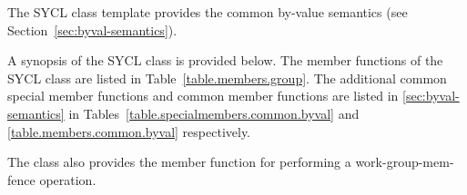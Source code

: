 The SYCL  class template provides the common by-value
semantics (see Section~\ref{sec:byval-semantics}).

A synopsis of the SYCL  class is provided below. The member functions of the SYCL  class are listed in Table~\ref{table.members.group}. The additional common special member functions and common member functions are listed in \ref{sec:byval-semantics} in Tables~\ref{table.specialmembers.common.byval} and \ref{table.members.common.byval} respectively.

The  class also provides the  member function for performing a \gls{work-group-mem-fence}
operation.



